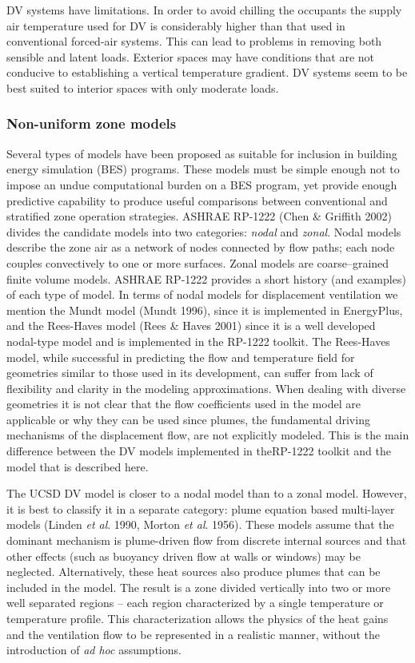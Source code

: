 DV systems have limitations. In order to avoid chilling the occupants the supply air temperature used for DV is considerably higher than that used in conventional forced-air systems. This can lead to problems in removing both sensible and latent loads. Exterior spaces may have conditions that are not conducive to establishing a vertical temperature gradient. DV systems seem to be best suited to interior spaces with only moderate loads.

\subsubsection{Non-uniform zone models}\label{non-uniform-zone-models}

Several types of models have been proposed as suitable for inclusion in building energy simulation (BES) programs. These models must be simple enough not to impose an undue computational burden on a BES program, yet provide enough predictive capability to produce useful comparisons between conventional and stratified zone operation strategies. ASHRAE RP-1222 (Chen \& Griffith 2002) divides the candidate models into two categories: \emph{nodal} and \emph{zonal}. Nodal models describe the zone air as a network of nodes connected by flow paths; each node couples convectively to one or more surfaces. Zonal models are coarse--grained finite volume models. ASHRAE RP-1222 provides a short history (and examples) of each type of model. In terms of nodal models for displacement ventilation we mention the Mundt model (Mundt 1996), since it is implemented in EnergyPlus, and the Rees-Haves model (Rees \& Haves 2001) since it is a well developed nodal-type model and is implemented in the RP-1222 toolkit. The Rees-Haves model, while successful in predicting the flow and temperature field for geometries similar to those used in its development, can suffer from lack of flexibility and clarity in the modeling approximations. When dealing with diverse geometries it is not clear that the flow coefficients used in the model are applicable or why they can be used since plumes, the fundamental driving mechanisms of the displacement flow, are not explicitly modeled. This is the main difference between the DV models implemented in theRP-1222 toolkit and the model that is described here.

The UCSD DV model is closer to a nodal model than to a zonal model. However, it is best to classify it in a separate category: plume equation based multi-layer models (Linden \emph{et al}. 1990, Morton \emph{et al}. 1956). These models assume that the dominant mechanism is plume-driven flow from discrete internal sources and that other effects (such as buoyancy driven flow at walls or windows) may be neglected. Alternatively, these heat sources also produce plumes that can be included in the model. The result is a zone divided vertically into two or more well separated regions -- each region characterized by a single temperature or temperature profile. This characterization allows the physics of the heat gains and the ventilation flow to be represented in a realistic manner, without the introduction of \emph{ad hoc} assumptions.

